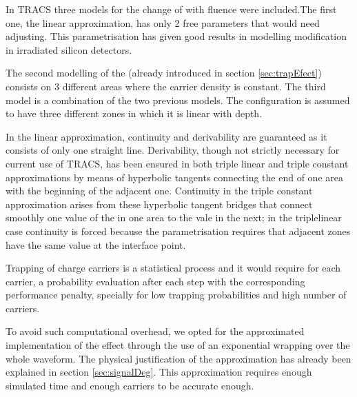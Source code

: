 
In TRACS three models for the change of \neff with fluence were included.The first one, the linear approximation, has only 2 free parameters that would need adjusting. This parametrisation has given good results in modelling \neff modification in irradiated silicon detectors.

The second modelling of the \neff (already introduced in section \ref{sec:trapEfect}) consists on 3 different areas where the carrier density is constant. 
The third model is a combination of the two previous models. The \neff configuration is assumed to have three different zones in which it is linear with depth. %

In the linear approximation, continuity and derivability are guaranteed as it consists of only one straight line. Derivability, though not strictly necessary for current use of TRACS, has been ensured in both triple linear and triple constant approximations by means of hyperbolic tangents connecting the end of one area with the beginning of the adjacent one. Continuity in the triple constant approximation arises from these hyperbolic tangent bridges that connect smoothly one value of the \neff in one area to the vale in the next; in the triplelinear case continuity is forced because the parametrisation requires that adjacent \neff zones have the same value at the interface point. 

Trapping of charge carriers is a statistical process and it would require for each carrier, a probability evaluation after each step with the corresponding performance penalty, specially for low trapping probabilities and high number of carriers.

To avoid such computational overhead, we opted for the approximated implementation of the effect through the use of an exponential wrapping over the whole waveform. The physical justification of the approximation has already been explained in section \ref{sec:signalDeg}. This approximation requires enough simulated time and enough carriers to be accurate enough.

